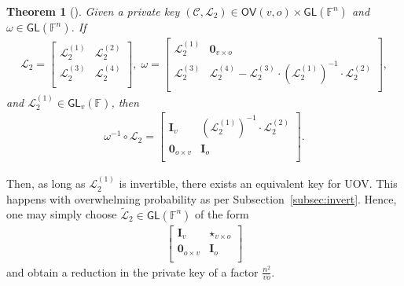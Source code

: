 \documentclass[draft, 12pt, a4paper, oneside]{memoir}
\newtheorem{theorem}{Theorem}[section]
\theoremstyle{definition}
\begin{document}
\begin{theorem}[{\cite[Theorem 2]{Beullens:201706}}]
  Given a private key $(\mathcal{C}, \mathcal{L}_{2}) \in \mathsf{OV}(v, o) \times \mathsf{GL}(\mathbb{F}^{n})$ and $\omega \in \mathsf{GL}(\mathbb{F}^{n})$. If
  \begin{align}
    \mathcal{L}_{2} = 
    \begin{bmatrix}
      \mathcal{L}_{2}^{(1)} & \mathcal{L}_{2}^{(2)} \\
      \mathcal{L}_{2}^{(3)} & \mathcal{L}_{2}^{(4)} \\
    \end{bmatrix}, \;
    \omega =
    \begin{bmatrix}
      \mathcal{L}_{2}^{(1)} & \mathbf{0}_{v \times o} \\
      \mathcal{L}_{2}^{(3)} & \mathcal{L}_{2}^{(4)} -\mathcal{L}_{2}^{(3)} \cdot (\mathcal{L}_{2}^{(1)})^{-1} \cdot \mathcal{L}_{2}^{(2)} \\
    \end{bmatrix},
  \end{align}
  and $\mathcal{L}_{2}^{(1)} \in \mathsf{GL}_{v}(\mathbb{F})$, then
  \begin{align}
    \omega^{-1} \circ \mathcal{L}_{2} =
    \begin{bmatrix}
      \mathbf{I}_{v} & (\mathcal{L}_{2}^{(1)})^{-1} \cdot \mathcal{L}_{2}^{(2)} \\
      \mathbf{0}_{o \times v} & \mathbf{I}_{o} \\
    \end{bmatrix}.
  \end{align}
\end{theorem}

Then, as long as $\mathcal{L}_{2}^{(1)}$ is invertible, there exists an equivalent key for UOV. This happens with overwhelming probability as per Subsection~\ref{subsec:invert}. Hence, one may simply choose $\widetilde{\mathcal{L}}_{2} \in \mathsf{GL}(\mathbb{F}^{n})$ of the form
\begin{align}
  \begin{bmatrix}
    \mathbf{I}_{v}          & \star_{v \times o} \\
    \mathbf{0}_{o \times v} & \mathbf{I}_{o} \\
  \end{bmatrix}
\end{align}
and obtain a reduction in the private key of a factor $\frac{n^{2}}{vo}$.

\end{document}
